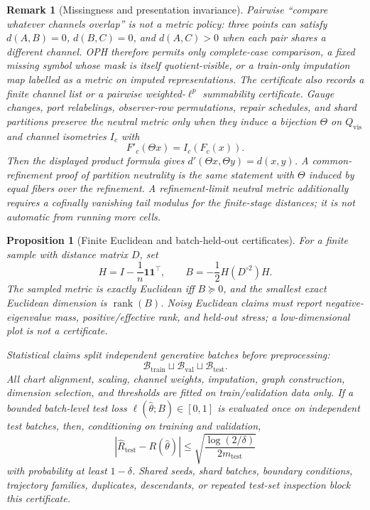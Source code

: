 \documentclass[11pt]{article}
\newtheorem{proposition}[theorem]{Proposition}
\newtheorem{remark}[theorem]{Remark}
\begin{document}
\begin{remark}[Missingness and presentation invariance]\label{rem:neutral-missingness-invariance}
Pairwise ``compare whatever channels overlap'' is not a metric policy: three points can satisfy
\(d(A,B)=0\), \(d(B,C)=0\), and \(d(A,C)>0\) when each pair shares a different channel. OPH
therefore permits only complete-case comparison, a fixed missing symbol whose mask is itself
quotient-visible, or a train-only imputation map labelled as a metric on imputed
representations. The certificate also records a finite channel list or a
pairwise weighted-\(\ell^p\) summability certificate. Gauge changes, port
relabelings, observer-row permutations, repair schedules,
and shard partitions preserve the neutral metric only when they induce a bijection
\(\Theta\) on \(Q_{\mathrm{vis}}\) and channel isometries \(I_c\) with
\[
F'_c(\Theta x)=I_c(F_c(x)).
\]
Then the displayed product formula gives \(d'(\Theta x,\Theta y)=d(x,y)\). A common-refinement
proof of partition neutrality is the same statement with \(\Theta\) induced by equal fibers over
the refinement. A refinement-limit neutral metric additionally requires a cofinally vanishing
tail modulus for the finite-stage distances; it is not automatic from running more cells.
\end{remark}

\begin{proposition}[Finite Euclidean and batch-held-out certificates]\label{prop:neutral-euclidean-stat-cert}
For a finite sample with distance matrix \(D\), set
\[
H=I-\frac1n\mathbf 1\mathbf 1^\top,\qquad
B=-\frac12H(D^{\circ2})H .
\]
The sampled metric is exactly Euclidean iff \(B\succeq0\), and the smallest exact Euclidean
dimension is \(\operatorname{rank}(B)\). Noisy Euclidean claims must report negative-eigenvalue
mass, positive/effective rank, and held-out stress; a low-dimensional plot is not a certificate.

Statistical claims split independent generative batches before preprocessing:
\[
\mathcal B_{\mathrm{train}}\sqcup\mathcal B_{\mathrm{val}}\sqcup\mathcal B_{\mathrm{test}}.
\]
All chart alignment, scaling, channel weights, imputation, graph construction, dimension
selection, and thresholds are fitted on train/validation data only. If a bounded batch-level test
loss \(\ell(\widehat\theta;B)\in[0,1]\) is evaluated once on independent test batches, then,
conditioning on training and validation,
\[
\left|
\widehat R_{\mathrm{test}}-R(\widehat\theta)
\right|
\le
\sqrt{\frac{\log(2/\delta)}{2m_{\mathrm{test}}}}
\]
with probability at least \(1-\delta\). Shared seeds, shard batches, boundary conditions,
trajectory families, duplicates, descendants, or repeated test-set inspection block this
certificate.
\end{proposition}
\end{document}
